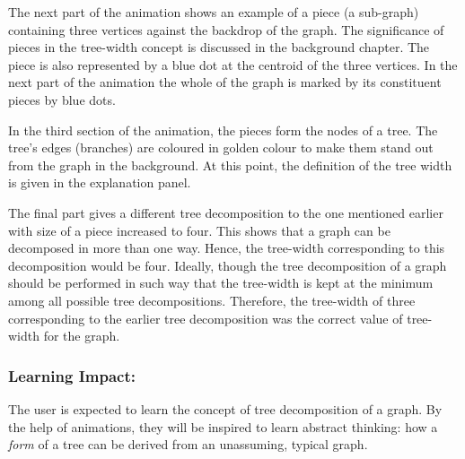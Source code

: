 The next part of the animation shows an example of a piece (a sub-graph)
containing three vertices against the backdrop of the graph. The significance
of pieces in the tree-width concept is discussed in the background chapter.
The piece is also represented by a blue dot at the centroid of the three
vertices. In the next part of the animation the whole of the graph is marked by
its constituent pieces by blue dots. 

In the third section of the animation, the pieces form the nodes of a tree. The tree's edges
(branches) are coloured in golden colour to make them stand out from the graph in
the background. At this point, the definition of the tree width is given in
the explanation panel.

The final part gives a different tree decomposition to the one mentioned
earlier with size of a piece increased to four. This shows that a graph can be
decomposed in more than one way. Hence, the tree-width corresponding to this
decomposition would be four. Ideally, though the tree decomposition of a graph
should be performed in such way that the tree-width is kept at the minimum
among all possible tree decompositions. Therefore, the tree-width of three
corresponding to the earlier tree decomposition was the correct value of
tree-width for the graph.

\subsubsection{Learning Impact:}
The user is expected to learn the concept of tree decomposition of a graph.
By the help of animations, they will be inspired to learn abstract
thinking: how a \emph{form} of a tree can be derived from an unassuming,
typical graph.
